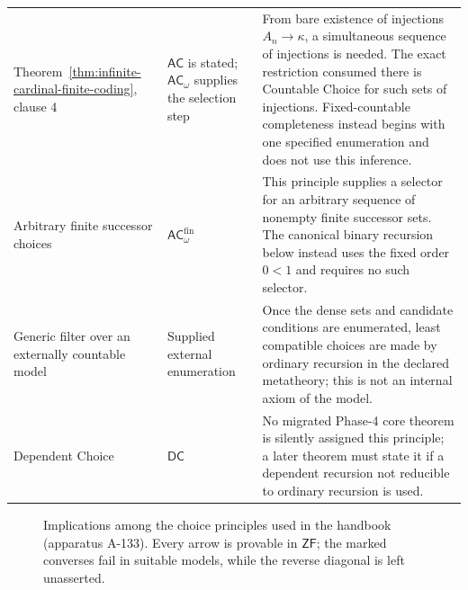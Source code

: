 \begin{longtable}{@{}p{}p{}p{}@{}}
Theorem~\ref{thm:infinite-cardinal-finite-coding}, clause 4 &
\(\mathsf{AC}\) is stated;
\(\mathsf{AC}_{\omega}\) supplies the selection step & From bare existence
of injections \(A_n\to\kappa\), a simultaneous sequence of injections is
needed.  The exact restriction consumed there is Countable Choice for such
sets of injections.  Fixed-countable completeness instead begins with one
specified enumeration and does not use this inference. \\
Arbitrary finite successor choices &
\(\mathsf{AC}_{\omega}^{\mathrm{fin}}\) & This principle supplies a selector
for an arbitrary sequence of nonempty finite successor sets.  The canonical
binary recursion below instead uses the fixed order \(0<1\) and requires no
such selector. \\
Generic filter over an externally countable model & Supplied external
enumeration & Once the dense sets and candidate conditions are enumerated,
least compatible choices are made by ordinary recursion in the declared
metatheory; this is not an internal axiom of the model. \\
Dependent Choice & \(\mathsf{DC}\) & No migrated Phase-4 core theorem is
silently assigned this principle; a later theorem must state it if a
dependent recursion not reducible to ordinary recursion is used. \\
\bottomrule
\end{longtable}
\endgroup

\begin{figure}[!htbp]
\centering
{}
\caption{Implications among the choice principles used in the handbook
  (apparatus A-133).  Every arrow is provable in \(\mathsf{ZF}\); the marked
  converses fail in suitable models, while the reverse diagonal is left
  unasserted.}
\label{fig:p06-choice-implications}
\end{figure}
\clearpage

